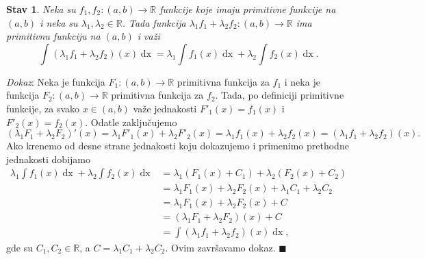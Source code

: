 \documentclass{article}
\newtheorem{stav}{Stav}[section]
\DeclareMathOperator{\dx}{dx}
\begin{document}
\begin{stavbox}
    \label{stav_1.2}
    \begin{stav}
        Neka su $f_1,f_2:\left(a,b\right)\longrightarrow\mathbb{R}$ funkcije koje
        imaju primitivne funkcije na $\left(a, b\right)$ i neka su
        $\lambda_1,\lambda_2\in\mathbb{R}$. Tada funkcija
        $\lambda_1f_1+\lambda_2f_2:\left(a,b\right)\longrightarrow\mathbb{R}$ ima
        primitivnu funkciju na $\left(a, b\right)$ i važi
        $$\int\left(\lambda_1f_1+\lambda_2f_2\right)\left(x\right)\dx=
            \lambda_1\int f_1\left(x\right)\dx+\lambda_2\int f_2\left(x\right)\dx.$$
    \end{stav}
\end{stavbox}

\textit{Dokaz}: Neka je funkcija $F_1:\left(a,b\right)\longrightarrow\mathbb{R}$
primitivna funkcija za $f_1$ i neka je funkcija $F_2:\left(a,b\right)\longrightarrow\mathbb{R}$
primitivna funkcija za $f_2$. Tada, po definiciji primitivne funkcije, za svako
$x\in\left(a,b\right)$ važe jednakosti $F'_1\left(x\right)=f_1\left(x\right)$ i
$F'_2\left(x\right)=f_2\left(x\right)$. Odatle zaključujemo
$$  \left(\lambda_1F_1+\lambda_2F_2\right)'\left(x\right)=
    \lambda_1F'_1\left(x\right)+\lambda_2 F'_2\left(x\right)=
    \lambda_1f_1\left(x\right)+\lambda_2f_2\left(x\right)=
    \left(\lambda_1f_1+\lambda_2f_2\right)\left(x\right).$$
Ako krenemo od desne strane jednakosti koju dokazujemo i
primenimo prethodne jednakosti dobijamo
\begin{align*}
    \lambda_1\int f_1\left(x\right) \dx + \lambda_2\int f_2\left(x\right) \dx & =\lambda_1\left(F_1\left(x\right) + C_1\right) + \lambda_2\left(F_2\left(x\right) + C_2\right) \\
                                                                              & =\lambda_1  F_1\left(x\right) + \lambda_2  F_2\left(x\right) + \lambda_1  C_1 + \lambda_2  C_2 \\
                                                                              & =\lambda_1  F_1\left(x\right) + \lambda_2  F_2\left(x\right) + C                               \\
                                                                              & =\left(\lambda_1 F_1 + \lambda_2 F_2\right)\left(x\right) + C                                  \\
                                                                              & =\int \left(\lambda_1 f_1+ \lambda_2 f_2\right)\left(x\right)\dx,
\end{align*}
gde su $C_1,C_2\in\mathbb{R}$, a $C=\lambda_1C_1+\lambda_2C_2$. Ovim završavamo dokaz.
\null\hfill $\blacksquare$\par
\end{document}
